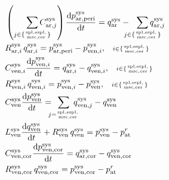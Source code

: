 \documentclass[a4paper,12pt]{report}
\begin{document}
\begin{align}
&\left(\sum_{j\in\{\mathrm{spl,espl,\atop msc,cer}\}}\!\!\!\!\!\!\!\!\!C_{\mathrm{ar},j}^{\mathrm{sys}}\right) \frac{\mathrm{d}p_{\mathrm{ar,peri}}^{\mathrm{sys}}}{\mathrm{d}t} = q_{\mathrm{ar}}^{\mathrm{sys}}-\!\!\!\!\!\sum_{j\in\{\mathrm{spl,espl,\atop msc,cer}\}}\!\!\!\!\!\!\!\!\!q_{\mathrm{ar},j}^{\mathrm{sys}}\nonumber\\
&R_{\mathrm{ar},i}^{\mathrm{sys}}\,q_{\mathrm{ar},i}^{\mathrm{sys}} = p_{\mathrm{ar,peri}}^{\mathrm{sys}} - p_{\mathrm{ven},i}^{\mathrm{sys}}, \quad\scriptstyle{i\in\{\mathrm{spl,espl,\atop msc,cer}\}}\nonumber\\
&C_{\mathrm{ven},i}^{\mathrm{sys}} \frac{\mathrm{d}p_{\mathrm{ven},i}^{\mathrm{sys}}}{\mathrm{d}t} = q_{\mathrm{ar},i}^{\mathrm{sys}} - q_{\mathrm{ven},i}^{\mathrm{sys}}, \quad\scriptstyle{i\in\{\mathrm{spl,espl,\atop msc,cer}\}}\nonumber\\
&R_{\mathrm{ven},i}^{\mathrm{sys}}\,q_{\mathrm{ven},i}^{\mathrm{sys}} = p_{\mathrm{ven},i}^{\mathrm{sys}}-p_{\mathrm{ven}}^{\mathrm{sys}}, \quad\scriptstyle{i\in\{\mathrm{spl,espl,\atop msc,cer}\}}\nonumber\\
&C_{\mathrm{ven}}^{\mathrm{sys}} \frac{\mathrm{d}p_{\mathrm{ven}}^{\mathrm{sys}}}{\mathrm{d}t} = \!\!\!\!\sum_{j=\mathrm{spl,espl,\atop msc,cer}}\!\!\!\!\!q_{\mathrm{ven},j}^{\mathrm{sys}}-q_{\mathrm{ven}}^{\mathrm{sys}}\nonumber\\
&L_{\mathrm{ven}}^{\mathrm{sys}}\frac{\mathrm{d}q_{\mathrm{ven}}^{\mathrm{sys}}}{\mathrm{d}t} + R_{\mathrm{ven}}^{\mathrm{sys}}\, q_{\mathrm{ven}}^{\mathrm{sys}} = p_{\mathrm{ven}}^{\mathrm{sys}} - p_{\mathrm{at}}^{r}\nonumber\\
&C_{\mathrm{ven,cor}}^{\mathrm{sys}} \frac{\mathrm{d}p_{\mathrm{ven,cor}}^{\mathrm{sys}}}{\mathrm{d}t} = q_{\mathrm{ar,cor}}^{\mathrm{sys}}-q_{\mathrm{ven,cor}}^{\mathrm{sys}}\nonumber\\
&R_{\mathrm{ven,cor}}^{\mathrm{sys}}\,q_{\mathrm{ven,cor}}^{\mathrm{sys}} = p_{\mathrm{ven,cor}}^{\mathrm{sys}} - p_{\mathrm{at}}^{r}\nonumber
\end{align}
\end{document}
